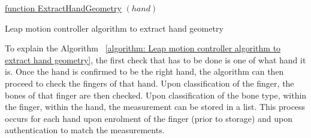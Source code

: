 \begin{algorithm}[H]

    \underline{function ExtractHandGeometry} $(hand)$\;
         
    \label{algorithm: Leap motion controller algorithm to extract hand geometry}
    \caption{Leap motion controller algorithm to extract hand geometry}
\end{algorithm}



To explain the Algorithm ~\ref{algorithm: Leap motion controller algorithm to extract hand geometry}, the first check that has to be done is one of what hand it is. Once the hand is confirmed to be the right hand, the algorithm can then proceed to check the fingers of that hand. Upon classification of the finger, the bones of that finger are then checked. Upon classification of the bone type, within the finger, within the hand, the measurement can be stored in a list. This process occurs for each hand upon enrolment of the finger (prior to storage) and upon authentication to match the measurements.

